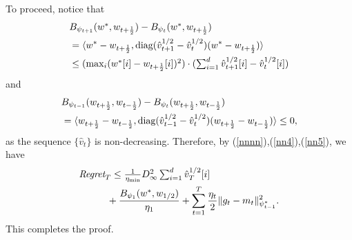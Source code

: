 \documentclass[11pt]{article}
\makeatletter
\renewenvironment{proof}[1][\proofname]{%
   \par\pushQED{\qed}\normalfont%
   \topsep6\p@\@plus6\p@\relax
   \trivlist\item[\hskip\labelsep\bfseries#1]%
   \ignorespaces
}{%
   \popQED\endtrivlist\@endpefalse
}
\theoremstyle{k}
\makeatother
\begin{document}
\begin{proof}
To proceed,
notice that
\begin{equation}  \label{nn4}
\begin{aligned}
\textstyle
& \textstyle B_{\psi_{t+1}}( w^*, w_{t+\frac{1}{2}}) - B_{\psi_t}( w^*, w_{t+\frac{1}{2}}) \\
&= \langle w^* - w_{t+\frac{1}{2}} , \text{diag}(\hat{v}_{t+1}^{1/2} -\hat{v}_t^{1/2} ) ( w^* - w_{t+\frac{1}{2}} ) \rangle
\\ & \textstyle \leq ( \max_i (w^*[i] - w_{t+\frac{1}{2}}[i] )^2  )\cdot
( \sum_{i=1}^d \hat{v}_{t+1}^{1/2}[i] -\hat{v}_t^{1/2}[i] )
\end{aligned}
\end{equation}
and
\begin{equation} \label{nn5}
\begin{aligned}
\textstyle
& B_{\psi_{t-1}}( w_{t+\frac{1}{2}}, w_{t-\frac{1}{2}})
- B_{\psi_t}(w_{t+\frac{1}{2}}, w_{t-\frac{1}{2}})
\\ & \textstyle = \langle w_{t+\frac{1}{2}} - w_{t-\frac{1}{2}} , \text{diag}(\hat{v}_{t-1}^{1/2} -\hat{v}_t^{1/2} ) ( w_{t+\frac{1}{2}} - w_{t-\frac{1}{2}} ) \rangle
\leq 0,
\end{aligned}
\end{equation}
as the sequence $\{\hat{v}_t\}$ is non-decreasing.
Therefore, by (\ref{nnnn}),(\ref{nn4}),(\ref{nn5}), we have
\begin{equation}\notag
\begin{aligned}
\textstyle
& \textstyle
 \text{\it Regret}_T
\leq \frac{1}{\eta_{\min}} D_{\infty}^2
\sum_{i=1}^d \hat{v}_{T}^{1/2}[i]
\\
&\hspace{0.4in}+ \frac{ B_{\psi_1}(w^*, w_{1/2})}{\eta_1}
+
 \sum_{t=1}^T
\frac{\eta_t}{2} \| g_t - m_t  \|_{\psi_{t-1}^*}^2.
\end{aligned}
\end{equation}
This completes the proof.
\end{proof}
\end{document}
